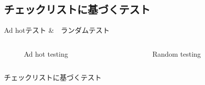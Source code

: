 \subsection{チェックリストに基づくテスト}
\begin{frame}{Ad hotテスト \&　ランダムテスト}

\begin{columns}[t]
\begin{column}{.5\textwidth}
\begin{figure}
\caption{Ad hot testing}
\end{figure}
\end{column}
\begin{column}{.5\textwidth}
\begin{figure}
\caption{Random testing}
\end{figure}
\end{column}
\end{columns}

\end{frame}


\begin{frame}{チェックリストに基づくテスト}
\end{frame}


